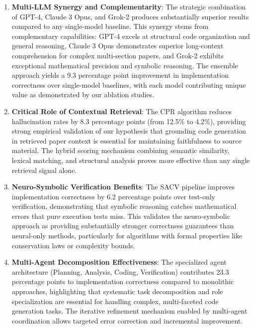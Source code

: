 \documentclass{ieeeaccess}
\begin{document}
\begin{enumerate}
\item \textbf{Multi-LLM Synergy and Complementarity}: The strategic combination of GPT-4, Claude 3 Opus, and Grok-2 produces substantially superior results compared to any single-model baseline. This synergy stems from complementary capabilities: GPT-4 excels at structural code organization and general reasoning, Claude 3 Opus demonstrates superior long-context comprehension for complex multi-section papers, and Grok-2 exhibits exceptional mathematical precision and symbolic reasoning. The ensemble approach yields a 9.3 percentage point improvement in implementation correctness over single-model baselines, with each model contributing unique value as demonstrated by our ablation studies.

\item \textbf{Critical Role of Contextual Retrieval}: The CPR algorithm reduces hallucination rates by 8.3 percentage points (from 12.5\% to 4.2\%), providing strong empirical validation of our hypothesis that grounding code generation in retrieved paper context is essential for maintaining faithfulness to source material. The hybrid scoring mechanism combining semantic similarity, lexical matching, and structural analysis proves more effective than any single retrieval signal alone.

\item \textbf{Neuro-Symbolic Verification Benefits}: The SACV pipeline improves implementation correctness by 6.2 percentage points over test-only verification, demonstrating that symbolic reasoning catches mathematical errors that pure execution tests miss. This validates the neuro-symbolic approach as providing substantially stronger correctness guarantees than neural-only methods, particularly for algorithms with formal properties like conservation laws or complexity bounds.

\item \textbf{Multi-Agent Decomposition Effectiveness}: The specialized agent architecture (Planning, Analysis, Coding, Verification) contributes 23.3 percentage points to implementation correctness compared to monolithic approaches, highlighting that systematic task decomposition and role specialization are essential for handling complex, multi-faceted code generation tasks. The iterative refinement mechanism enabled by multi-agent coordination allows targeted error correction and incremental improvement.
\end{enumerate}
\end{document}
